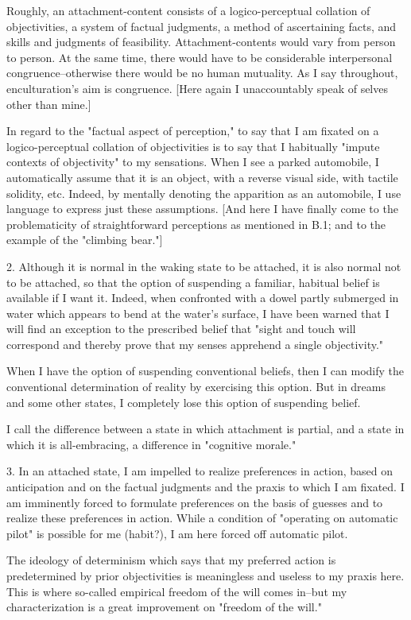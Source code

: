 Roughly, an attachment-content consists of a logico-perceptual collation of objectivities, a system of factual judgments, a method of ascertaining facts, and skills and judgments of feasibility. Attachment-contents would vary from person to person. At the same time, there would have to be considerable interpersonal congruence--otherwise there would be no human mutuality. As I say throughout, enculturation's aim is congruence. [Here again I unaccountably speak of selves other than mine.]

In regard to the "factual aspect of perception," to say that I am fixated on a logico-perceptual collation of objectivities is to say that I habitually "impute contexts of objectivity" to my sensations. When I see a parked automobile, I automatically assume that it is an object, with a reverse visual side, with tactile solidity, etc. Indeed, by mentally denoting the apparition as an automobile, I use language to express just these assumptions. [And here I have finally come to the problematicity of straightforward perceptions as mentioned in B.1; and to the example of the "climbing bear."]

2. Although it is normal in the waking state to be attached, it is also normal not to be attached, so that the option of suspending a familiar, habitual belief is available if I want it. Indeed, when confronted with a dowel partly submerged in water which appears to bend at the water's surface, I have been warned that I will find an exception to the prescribed belief that "sight and touch will correspond and thereby prove that my senses apprehend a single objectivity."

When I have the option of suspending conventional beliefs, then I can modify the conventional determination of reality by exercising this option. But in dreams and some other states, I completely lose this option of suspending belief.

I call the difference between a state in which attachment is partial, and a state in which it is all-embracing, a difference in "cognitive morale."

3. In an attached state, I am impelled to realize preferences in action, based on anticipation and on the factual judgments and the praxis to which I am fixated. I am imminently forced to formulate preferences on the basis of guesses and to realize these preferences in action. While a condition of "operating on automatic pilot" is possible for me (habit?), I am here forced off automatic pilot.

The ideology of determinism which says that my preferred action is predetermined by prior objectivities is meaningless and useless to my praxis here. This is where so-called empirical freedom of the will comes in--but my characterization is a great improvement on "freedom of the will."

